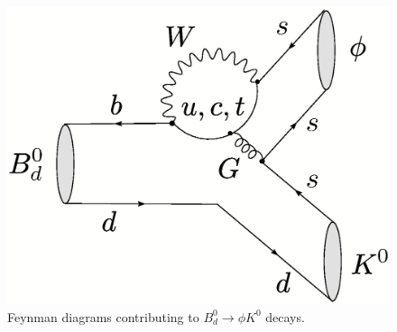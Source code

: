 \documentclass[12pt]{article}
\begin{document}
\begin{figure}
\centerline{
 \includegraphics[width=5.5truecm]{B0dtophiK0.ps} 
 }
 \vspace*{-0.3truecm}
\caption{Feynman diagrams contributing to $B^0_d\to \phi K^0$ 
decays.}\label{fig:BphiK-diag}
\end{figure}


%
%
%
\boldmath
\end{document}
